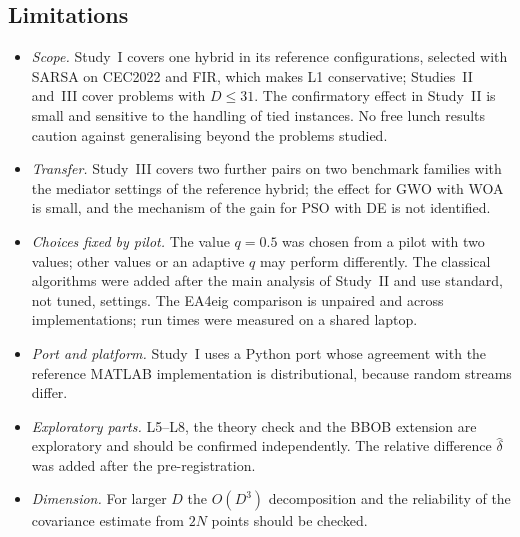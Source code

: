 \subsection{Limitations}
\begin{itemize}
\item \emph{Scope.} Study~I covers one hybrid in its reference configurations, selected with SARSA on CEC2022 and FIR,
which makes L1 conservative; Studies~II and~III cover problems with $D\le31$. The confirmatory effect in Study~II is small and
sensitive to the handling of tied instances. No free lunch results~\citep{wolpert1997nfl} caution against generalising beyond the
problems studied.
\item \emph{Transfer.} Study~III covers two further pairs on two benchmark families with the mediator settings of the
reference hybrid; the effect for GWO with WOA is small, and the mechanism of the gain for PSO with DE is not identified.
\item \emph{Choices fixed by pilot.} The value $q=0.5$ was chosen from a pilot with two values; other values or an adaptive
$q$ may perform differently. The classical algorithms were added after the main analysis of Study~II and use standard, not
tuned, settings. The EA4eig comparison is unpaired and across implementations; run times were measured on a shared laptop.
\item \emph{Port and platform.} Study~I uses a Python port whose agreement with the reference MATLAB implementation is
distributional, because random streams differ.
\item \emph{Exploratory parts.} L5--L8, the theory check and the BBOB extension are exploratory and should be confirmed
independently. The relative difference $\hat\delta$ was added after the pre-registration.
\item \emph{Dimension.} For larger $D$ the $O(D^3)$ decomposition and the reliability of the covariance estimate from $2N$
points should be checked.
\end{itemize}

